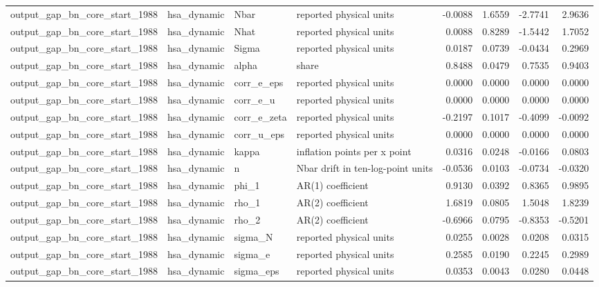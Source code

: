 \begin{tabular}{llllrrrr}
output\_gap\_bn\_core\_start\_1988 & hsa\_dynamic & Nbar & reported physical units & -0.0088 & 1.6559 & -2.7741 & 2.9636 \\
output\_gap\_bn\_core\_start\_1988 & hsa\_dynamic & Nhat & reported physical units & 0.0088 & 0.8289 & -1.5442 & 1.7052 \\
output\_gap\_bn\_core\_start\_1988 & hsa\_dynamic & Sigma & reported physical units & 0.0187 & 0.0739 & -0.0434 & 0.2969 \\
output\_gap\_bn\_core\_start\_1988 & hsa\_dynamic & alpha & share & 0.8488 & 0.0479 & 0.7535 & 0.9403 \\
output\_gap\_bn\_core\_start\_1988 & hsa\_dynamic & corr\_e\_eps & reported physical units & 0.0000 & 0.0000 & 0.0000 & 0.0000 \\
output\_gap\_bn\_core\_start\_1988 & hsa\_dynamic & corr\_e\_u & reported physical units & 0.0000 & 0.0000 & 0.0000 & 0.0000 \\
output\_gap\_bn\_core\_start\_1988 & hsa\_dynamic & corr\_e\_zeta & reported physical units & -0.2197 & 0.1017 & -0.4099 & -0.0092 \\
output\_gap\_bn\_core\_start\_1988 & hsa\_dynamic & corr\_u\_eps & reported physical units & 0.0000 & 0.0000 & 0.0000 & 0.0000 \\
output\_gap\_bn\_core\_start\_1988 & hsa\_dynamic & kappa & inflation points per x point & 0.0316 & 0.0248 & -0.0166 & 0.0803 \\
output\_gap\_bn\_core\_start\_1988 & hsa\_dynamic & n & Nbar drift in ten-log-point units & -0.0536 & 0.0103 & -0.0734 & -0.0320 \\
output\_gap\_bn\_core\_start\_1988 & hsa\_dynamic & phi\_1 & AR(1) coefficient & 0.9130 & 0.0392 & 0.8365 & 0.9895 \\
output\_gap\_bn\_core\_start\_1988 & hsa\_dynamic & rho\_1 & AR(2) coefficient & 1.6819 & 0.0805 & 1.5048 & 1.8239 \\
output\_gap\_bn\_core\_start\_1988 & hsa\_dynamic & rho\_2 & AR(2) coefficient & -0.6966 & 0.0795 & -0.8353 & -0.5201 \\
output\_gap\_bn\_core\_start\_1988 & hsa\_dynamic & sigma\_N & reported physical units & 0.0255 & 0.0028 & 0.0208 & 0.0315 \\
output\_gap\_bn\_core\_start\_1988 & hsa\_dynamic & sigma\_e & reported physical units & 0.2585 & 0.0190 & 0.2245 & 0.2989 \\
output\_gap\_bn\_core\_start\_1988 & hsa\_dynamic & sigma\_eps & reported physical units & 0.0353 & 0.0043 & 0.0280 & 0.0448 \\

\end{tabular}
